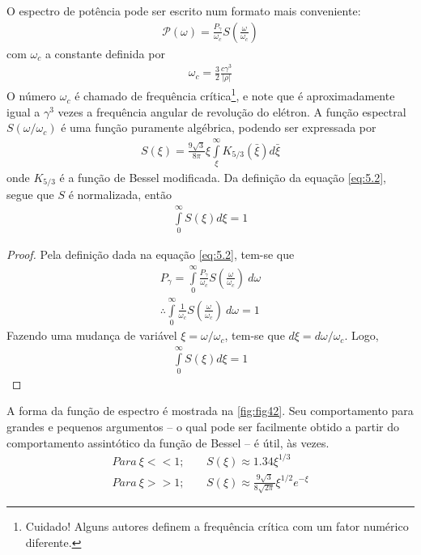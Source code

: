 O espectro de potência pode ser escrito num formato mais conveniente:
\begin{align}
	\mathscr{P}(\omega) = \frac{P_\gamma}{\omega_c} S\left(\frac{\omega}{\omega_c}\right)\label{eq:5.2}
\end{align}
com $\omega_c$ a constante definida por
\begin{align}
	\omega_c = \frac{3}{2}\frac{c\gamma^3}{|\rho|}
\end{align}
O número $\omega_c$ é chamado de frequência crítica\footnote{Cuidado! Alguns autores definem a frequência crítica com um fator numérico diferente.}, e note que é aproximadamente igual a $\gamma^3$ vezes a frequência angular de revolução do elétron. A função espectral $S(\omega/\omega_c)$ é uma função puramente algébrica, podendo ser expressada por
\begin{align}
	S(\xi) = \frac{9\sqrt{3}}{8\pi}\xi\int\limits_{\xi}^{\infty}K_{5/3}(\bar{\xi})d\bar{\xi}
\end{align}
onde $K_{5/3}$ é a função de Bessel modificada. Da definição da equação \eqref{eq:5.2}, segue que $S$ é normalizada, então
\begin{align}
	\int\limits_{0}^{\infty}S(\xi)d\xi = 1
\end{align}

\begin{proof}
	Pela definição dada na equação \eqref{eq:5.2}, tem-se que
	\begin{align*}
		P_\gamma = \int\limits_{0}^{\infty}\frac{P_\gamma}{\omega_c} S\left(\frac{\omega}{\omega_c}\right)\ d\omega\\
		\therefore \int\limits_{0}^{\infty}\frac{1}{\omega_c} S\left(\frac{\omega}{\omega_c}\right)\ d\omega = 1
	\end{align*}
	Fazendo uma mudança de variável $\xi = \omega/\omega_c $, tem-se que $d\xi = d\omega/\omega_c$. Logo,
	\begin{align*}
		\int\limits_{0}^{\infty}S(\xi)d\xi = 1
	\end{align*}
\end{proof}

A forma da função de espectro é mostrada na \autoref{fig:fig42}. Seu comportamento para grandes e pequenos argumentos -- o qual pode ser facilmente obtido a partir do comportamento assintótico da função de Bessel -- é útil, às vezes.
\begin{align}
	Para\ \xi<<1;&\ \ \ \ \ S(\xi)\approx 1.34 \xi^{1/3}\nonumber\\
	Para\ \xi>>1;&\ \ \ \ \ S(\xi)\approx \frac{9\sqrt{3}}{8\sqrt{2\pi}} \xi^{1/2}e^{-\xi}\label{eq:5.6}
\end{align}

